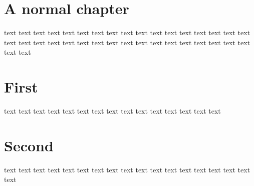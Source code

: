 \documentclass[12pt]{report}
\begin{document}
\tableofcontents
\chapter{A normal chapter}
text text text text text text text text text text text text text text text text text text text text text text text text text text text text text text text text text text text text 
\appendix

\chapter{First}
text text text text text text text text text text text text text text text 
\chapter{Second}
text text text text text text text text text text text text text text text text text text 
\end{document}
